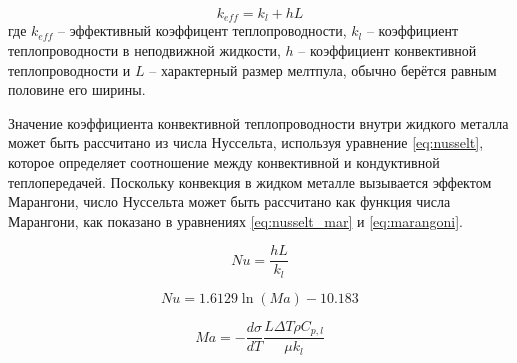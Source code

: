 \begin{equation}
    k_{eff} = k_l + hL
\end{equation}
где $k_{eff}$ -- эффективный коэффицент теплопроводности, $k_l$ -- коэффициент теплопроводности в неподвижной жидкости, $h$ -- коэффициент конвективной теплопроводности и $L$ -- характерный размер мелтпула, обычно берётся равным половине его ширины.  

Значение коэффициента конвективной теплопроводности внутри жидкого металла может быть рассчитано из числа Нуссельта, используя уравнение \ref{eq:nusselt}, которое определяет соотношение между конвективной и кондуктивной теплопередачей. Поскольку конвекция в жидком металле вызывается эффектом Марангони, число Нуссельта может быть рассчитано как функция числа Марангони, как показано в уравнениях \ref{eq:nusselt_mar} и \ref{eq:marangoni}.

\begin{equation}
    \label{eq:nusselt}
    Nu = \frac{hL}{k_l}
\end{equation}

\begin{equation}
    \label{eq:nusselt_mar}
    Nu = 1.6129\ln (Ma) - 10.183
\end{equation}

\begin{equation}
    \label{eq:marangoni}
    Ma = - \frac{d\sigma}{dT} \frac{L\Delta T \rho C_{p,l}}{\mu k_l}
\end{equation}

\clearpage